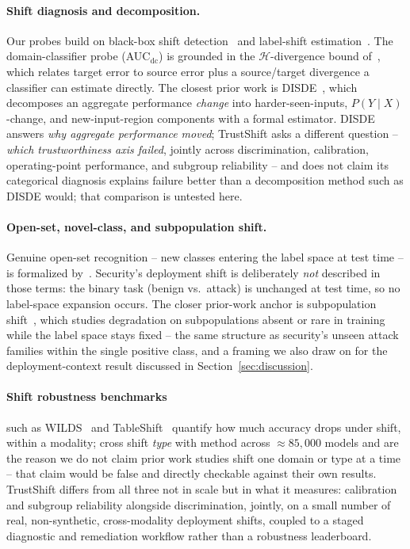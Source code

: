 \documentclass[11pt]{article}
\begin{document}
\paragraph{Shift diagnosis and decomposition.} Our probes build on black-box shift
detection~\citep{rabanser2019failing} and label-shift estimation~\citep{lipton2018label}. The
domain-classifier probe (AUC$_{\text{dc}}$) is grounded in the $\mathcal{H}$-divergence bound
of~\citet{bendavid2010theory}, which relates target error to source error plus a source/target
divergence a classifier can estimate directly. The closest prior work is
DISDE~\citep{cai2023disde}, which decomposes an aggregate performance \emph{change} into
harder-seen-inputs, $P(Y\mid X)$-change, and new-input-region components with a formal estimator.
DISDE answers \emph{why aggregate performance moved}; TrustShift asks a different question --
\emph{which trustworthiness axis failed}, jointly across discrimination, calibration,
operating-point performance, and subgroup reliability -- and does not claim its categorical
diagnosis explains failure better than a decomposition method such as DISDE would; that comparison
is untested here.

\paragraph{Open-set, novel-class, and subpopulation shift.} Genuine open-set recognition -- new
classes entering the label space at test time -- is formalized by~\citet{scheirer2013toward}.
Security's deployment shift is deliberately \emph{not} described in those terms: the binary task
(benign vs.\ attack) is unchanged at test time, so no label-space expansion occurs. The closer
prior-work anchor is subpopulation shift~\citep{yang2023change}, which studies degradation on
subpopulations absent or rare in training while the label space stays fixed -- the same structure
as security's unseen attack families within the single positive class, and a framing we also draw
on for the deployment-context result discussed in Section~\ref{sec:discussion}.

\paragraph{Shift robustness benchmarks} such as WILDS~\citep{koh2021wilds} and
TableShift~\citep{gardner2023tableshift} quantify how much accuracy drops under shift, within a
modality; \citet{wiles2022fine} cross shift \emph{type} with method across
$\approx\!85{,}000$ models and are the reason we do not claim prior work studies shift one domain or
type at a time -- that claim would be false and directly checkable against their own results.
TrustShift differs from all three not in scale but in what it measures: calibration and subgroup
reliability alongside discrimination, jointly, on a small number of real, non-synthetic,
cross-modality deployment shifts, coupled to a staged diagnostic and remediation workflow rather
than a robustness leaderboard.
\end{document}
